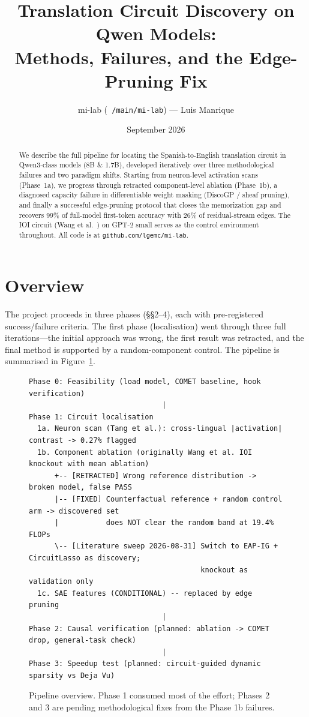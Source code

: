 \documentclass[11pt,a4paper]{article}
\title{\textbf{Translation Circuit Discovery on Qwen Models:\\Methods, Failures, and the Edge-Pruning Fix}}
\author{mi-lab (\texttt{~/main/mi-lab}) --- Luis Manrique}
\date{September 2026}
\begin{document}
\maketitle

\begin{abstract}
We describe the full pipeline for locating the Spanish-to-English translation circuit in
Qwen3-class models (8B \& 1.7B), developed iteratively over three methodological failures
and two paradigm shifts. Starting from neuron-level activation scans (Phase~1a), we
progress through retracted component-level ablation (Phase~1b), a diagnosed capacity
failure in differentiable weight masking (DiscoGP / sheaf pruning), and finally a
successful edge-pruning protocol that closes the memorization gap and recovers 99\% of
full-model first-token accuracy with 26\% of residual-stream edges. The IOI circuit
(Wang et al.~\cite{ioi}) on GPT-2 small serves as the control environment throughout.
All code is at \texttt{github.com/lgemc/mi-lab}.
\end{abstract}

\section{Overview}

The project proceeds in three phases (\S\S2--4), each with pre-registered
success/failure criteria. The first phase (localisation) went through three full
iterations---the initial approach was wrong, the first result was retracted, and the
final method is supported by a random-component control. The pipeline is summarised in
Figure~\ref{fig:pipeline}.

\begin{figure}[ht]
\centering
\begin{minipage}{0.92\textwidth}
\small
\begin{verbatim}
Phase 0: Feasibility (load model, COMET baseline, hook verification)
                               |
Phase 1: Circuit localisation
  1a. Neuron scan (Tang et al.): cross-lingual |activation| contrast -> 0.27% flagged
  1b. Component ablation (originally Wang et al. IOI knockout with mean ablation)
      +-- [RETRACTED] Wrong reference distribution -> broken model, false PASS
      |-- [FIXED] Counterfactual reference + random control arm -> discovered set
      |           does NOT clear the random band at 19.4% FLOPs
      \-- [Literature sweep 2026-08-31] Switch to EAP-IG + CircuitLasso as discovery;
                                        knockout as validation only
  1c. SAE features (CONDITIONAL) -- replaced by edge pruning
                               |
Phase 2: Causal verification (planned: ablation -> COMET drop, general-task check)
                               |
Phase 3: Speedup test (planned: circuit-guided dynamic sparsity vs Deja Vu)
\end{verbatim}
\end{minipage}
\caption{Pipeline overview. Phase 1 consumed most of the effort; Phases 2 and 3 are
pending methodological fixes from the Phase 1b failures.}
\label{fig:pipeline}
\end{figure}
\end{document}
